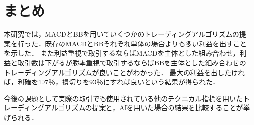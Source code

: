 \chapter{まとめ}
本研究では，MACDとBBを用いていくつかのトレーディングアルゴリズムの提案を行った．既存のMACDとBBそれぞれ単体の場合よりも多い利益を出すことを示した．
また利益重視で取引するならばMACDを主体とした組み合わせ，利益と取引数は下がるが勝率重視で取引するならばBBを主体とした組み合わせのトレーディングアルゴリズムが良いことがわかった．
最大の利益を出したければ，利確を107％，損切りを93％にすれば良いという結果が得られた．

今後の課題として実際の取引でも使用されている他のテクニカル指標を用いたトレーディングアルゴリズムの提案と，AIを用いた場合の結果を比較することが挙げられる．